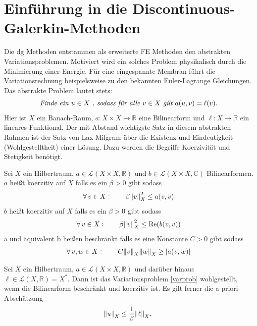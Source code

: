 \section{Einführung in die Discontinuous-Galerkin-Methoden}
Die \ac{dg} Methoden entstammen als erweiterte FE Methoden den abstrakten Variationsproblemen. Motiviert wird ein solches Problem physikalisch durch die Minimierung einer Energie. Für eine eingespannte Membran führt die Variationsrechnung beispielsweise zu den bekannten Euler-Lagrange Gleichungen. Das abstrakte Problem lautet stets:
\begin{equation}\label{varprob}
      \emph{Finde ein } u\in X\emph{ , sodass für alle } v\in X \emph{ gilt } a(u,v) = \ell(v).
\end{equation}
Hier ist $X$ ein Banach-Raum, $a:X\times X \rightarrow \mathbb{R}$ eine Bilinearform und ${\ell:X\rightarrow \mathbb{R}}$ ein lineares Funktional.
Der mit Abstand wichtigste Satz in diesem abstrakten Rahmen ist der Satz von Lax-Milgram \cite{buchPietro} über die Existenz und Eindeutigkeit (Wohlgestelltheit) einer Lösung. Dazu werden die Begriffe Koerzivität und Stetigkeit benötigt.
\begin{definition} \label{def:koerz}
  Sei $X$ ein Hilbertraum, $a \in \mathcal{L}(X\times X, \mathbb{R})$ und $b \in \mathcal{L}(X\times X, \mathbb{C})$ Bilinearformen. $a$ heißt koerzitiv auf $X$ falls es ein $\beta>0$ gibt sodass
  \begin{equation}
    \forall \, v \in X : \qquad \beta\norm{v}^2_X \leq a(v,v)
  \end{equation}
  $b$ heißt koerzitiv auf $X$ falls es ein $\beta>0$ gibt sodass
  \begin{equation}
    \forall \, v \in X : \qquad \beta\norm{v}^2_X \leq  \operatorname{Re}(b(v,v))   \label{eq:koerz_imag}
  \end{equation}
  a und äquivalent b heißen beschränkt falls es eine Konstante $C>0$ gibt sodass
  \begin{equation}
    \forall \, v,w \in X : \qquad C\norm{v}_X \norm{w}_X \geq |a(v,w)|
  \end{equation}
\end{definition}
\begin{satz}\label{laxmilgram}
  Sei $X$ ein Hilbertraum, $a \in \mathcal{L}(X\times X, \mathbb{R})$ und darüber hinaus ${\ell\in\mathcal{L}(X,\mathbb{R})=X^*}$. Dann ist das Variationsproblem \ref{varprob} wohlgestellt, wenn die Bilinearform beschränkt und koerzitiv ist. Es gilt ferner die a priori Abschätzung
  \begin{equation}
    \norm{u}_X \leq \frac{1}{\beta} \norm{\ell}_{X^*}
  \end{equation}
\end{satz}
